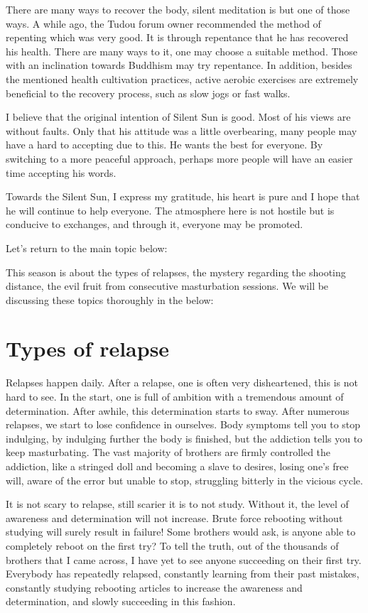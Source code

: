 \documentclass[
]{book}
\begin{document}
There are many ways to recover the body, silent meditation is but one of those ways. A while ago, the Tudou forum owner recommended the method of repenting which was very good. It is through repentance that he has recovered his health. There are many ways to it, one may choose a suitable method. Those with an inclination towards Buddhism may try repentance. In addition, besides the mentioned health cultivation practices, active aerobic exercises are extremely beneficial to the recovery process, such as slow jogs or fast walks.

I believe that the original intention of Silent Sun is good. Most of his views are without faults. Only that his attitude was a little overbearing, many people may have a hard to accepting due to this. He wants the best for everyone. By switching to a more peaceful approach, perhaps more people will have an easier time accepting his words.

Towards the Silent Sun, I express my gratitude, his heart is pure and I hope that he will continue to help everyone. The atmosphere here is not hostile but is conducive to exchanges, and through it, everyone may be promoted.

Let's return to the main topic below:

This season is about the types of relapses, the mystery regarding the shooting distance, the evil fruit from consecutive masturbation sessions. We will be discussing these topics thoroughly in the below:

\hypertarget{types-of-relapse-1}{%
\section{Types of relapse}\label{types-of-relapse-1}}

Relapses happen daily. After a relapse, one is often very disheartened, this is not hard to see. In the start, one is full of ambition with a tremendous amount of determination. After awhile, this determination starts to sway. After numerous relapses, we start to lose confidence in ourselves. Body symptoms tell you to stop indulging, by indulging further the body is finished, but the addiction tells you to keep masturbating. The vast majority of brothers are firmly controlled the addiction, like a stringed doll and becoming a slave to desires, losing one's free will, aware of the error but unable to stop, struggling bitterly in the vicious cycle.

It is not scary to relapse, still scarier it is to not study. Without it, the level of awareness and determination will not increase. Brute force rebooting without studying will surely result in failure! Some brothers would ask, is anyone able to completely reboot on the first try? To tell the truth, out of the thousands of brothers that I came across, I have yet to see anyone succeeding on their first try. Everybody has repeatedly relapsed, constantly learning from their past mistakes, constantly studying rebooting articles to increase the awareness and determination, and slowly succeeding in this fashion.
\end{document}
